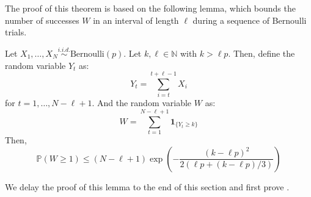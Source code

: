 \documentclass{article}
\begin{document}
The proof of this theorem is based on the following lemma, which bounds the number of successes $W$ in an interval of length $\ell$ during a sequence of Bernoulli trials.  

\begin{lemma}\label{lem:bernoulli_trials}
    Let $X_1, \ldots, X_N \overset{i.i.d.}{\sim} \text{Bernoulli}(p)$. Let $k, \ell \in \mathbb{N}$ with $k > \ell p$. Then, define the random variable $Y_t$ as:
    \begin{equation*}
        Y_t = \sum_{i=t}^{t+\ell-1}X_i
    \end{equation*}
    for $t=1, \ldots, N-\ell+1$. And the random variable $W$ as:
    \begin{equation*}
        W = \sum_{t=1}^{N-\ell+1} \mathbf{1}_{\{Y_t\geq k\}}
    \end{equation*}
    Then,
    \begin{equation*}
        \mathbb{P}(W\geq 1)\leq (N-\ell+1)\exp\left(-\frac{(k-\ell p)^2}{2(\ell p + (k - \ell p ) / 3)}\right)
    \end{equation*}
\end{lemma}

We delay the proof of this lemma to the end of this section and first prove .  
\end{document}
